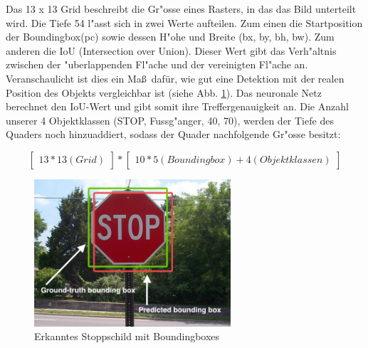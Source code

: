 Das 13 x 13 Grid beschreibt die Gr"osse eines Rasters, in das das Bild unterteilt wird. Die Tiefe 54 l"asst sich in zwei Werte aufteilen. Zum einen die Startposition der Boundingbox(pc) sowie dessen H"ohe und Breite (bx, by, bh, bw).  Zum anderen die IoU (Intersection over Union). Dieser Wert gibt das Verh"altnis zwischen der "uberlappenden Fl"ache und der vereinigten Fl"ache an. Veranschaulicht ist dies ein Ma\ss \ daf\"ur, wie gut eine Detektion mit der realen Position des Objekts vergleichbar ist (siehe Abb. \ref{fig:stoppschild}). Das neuronale Netz berechnet den IoU-Wert und gibt somit ihre Treffergenauigkeit an. Die Anzahl unserer 4 Objektklassen (STOP, Fussg"anger, 40, 70),  werden der Tiefe des Quaders noch hinzuaddiert,
sodass der Quader nachfolgende Gr"osse besitzt:


\begin{equation}
\begin{bmatrix}13 * 13 (Grid)\end{bmatrix} * \begin{bmatrix}10 * 5 (Boundingbox) + 4 (Objektklassen)\end{bmatrix}
\end{equation}

\begin{figure}[h]
	\centering
	\includegraphics[width=0.65\textwidth]{images/stoppschild}
	\caption{Erkanntes Stoppschild mit Boundingboxes}
	\label{fig:stoppschild}
\end{figure}

